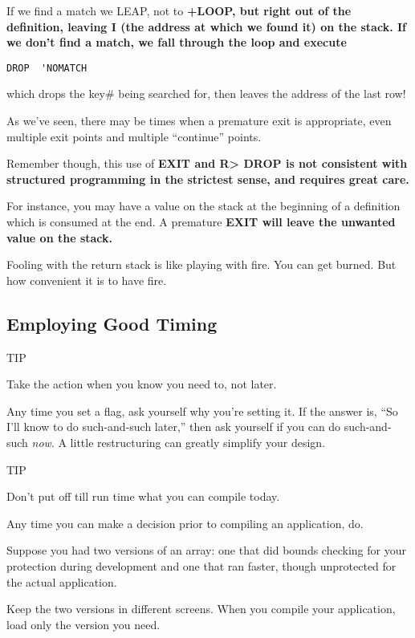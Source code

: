If we find a match we LEAP, not to \bf{+LOOP}, but right out of the definition,
leaving \bf{I} (the address at which we found it) on the stack. If we don't
find a match, we fall through the loop and execute

\begin{verbatim}
DROP  'NOMATCH
\end{verbatim}

which drops the key# being searched for, then leaves the address of the
last row!

As we've seen, there may be times when a premature exit is appropriate,
even multiple exit points and multiple ``continue'' points.

Remember though, this use of \bf{EXIT} and \bf{R> DROP} is not consistent
with structured programming in the strictest sense, and requires great
care.

For instance, you may have a value on the stack at the beginning of
a definition which is consumed at the end. A premature \bf{EXIT} will leave
the unwanted value on the stack.

Fooling with the return stack is like playing with fire. You can get
burned. But how convenient it is to have fire.

\subsection{Employing Good Timing}

TIP

Take the action when you know you need to, not later.

Any time you set a flag, ask yourself why you're setting it. If the answer
is, ``So I'll know to do such-and-such later,'' then ask yourself if you can
do such-and-such \emph{now}. A little restructuring can greatly simplify your
design.

TIP

Don't put off till run time what you can compile today.

Any time you can make a decision prior to compiling an application, do.

Suppose you had two versions of an array: one that did bounds
checking for your protection during development and one that ran faster,
though unprotected for the actual application.

Keep the two versions in different screens. When you compile your
application, load only the version you need.

